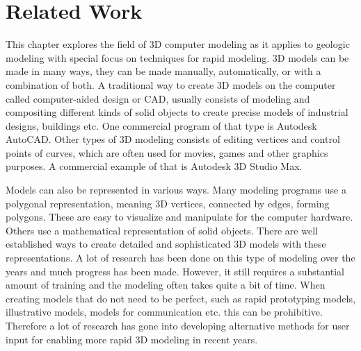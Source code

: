 \documentclass[a4paper,12pt]{report}
\begin{document}



\clearpage
\chapter{Related Work}
\label{sec:star}

This chapter explores the field of 3D computer modeling as it applies to geologic modeling with special focus on techniques for rapid modeling. 3D models can be made in many ways, they can be made manually, automatically, or with a combination of both.  A traditional way to create 3D models on the computer called computer-aided design or CAD, usually consists of modeling and compositing different kinds of solid objects to create precise models of industrial designs, buildings etc. One commercial program of that type is Autodesk AutoCAD. Other types of 3D modeling consists of editing vertices and control points of curves, which are often used for movies, games and other graphics purposes. A commercial example of that is Autodesk 3D Studio Max.

Models can also be represented in various ways. Many modeling programs use a polygonal representation, meaning 3D vertices, connected by edges, forming polygons. These are easy to visualize and manipulate for the computer hardware.  Others use a mathematical representation of solid objects. There are well established ways to create detailed and sophisticated 3D models with these representations. A lot of research has been done on this type of modeling over the years and much progress has been made. However, it still requires a substantial amount of training and the modeling often takes quite a bit of time. When creating models that do not need to be perfect, such as rapid prototyping models, illustrative models, models for communication etc. this can be prohibitive. Therefore a lot of research has gone into developing alternative methods for user input for enabling more rapid 3D modeling in recent years.
\end{document}
